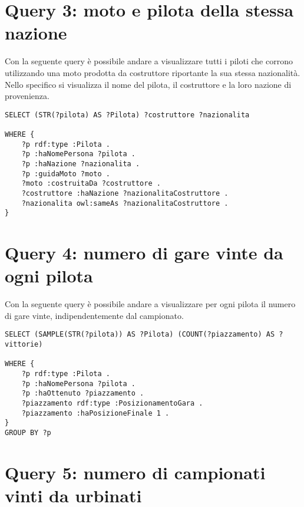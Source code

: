 \newpage

\section{Query 3: moto e pilota della stessa nazione}

Con la seguente query è possibile andare a visualizzare tutti i piloti che corrono utilizzando una moto prodotta da costruttore riportante la sua stessa nazionalità. Nello specifico si visualizza il nome del pilota, il costruttore e la loro nazione di provenienza.
\\

\begin{lstlisting}[captionpos=b, caption=Moto e pilota della stessa nazione, label=lst:sparql3,
   basicstyle=\ttfamily,frame=single]
SELECT (STR(?pilota) AS ?Pilota) ?costruttore ?nazionalita

WHERE {
	?p rdf:type :Pilota .
	?p :haNomePersona ?pilota .
	?p :haNazione ?nazionalita .
	?p :guidaMoto ?moto .
	?moto :costruitaDa ?costruttore .
	?costruttore :haNazione ?nazionalitaCostruttore .
	?nazionalita owl:sameAs ?nazionalitaCostruttore .
}
\end{lstlisting}


\section{Query 4: numero di gare vinte da ogni pilota}

Con la seguente query è possibile andare a visualizzare per ogni pilota il numero di gare vinte, indipendentemente dal campionato.
\\

\begin{lstlisting}[captionpos=b, caption=Numero di gare vinte da ogni pilota, label=lst:sparql4,
   basicstyle=\ttfamily,frame=single]
SELECT (SAMPLE(STR(?pilota)) AS ?Pilota) (COUNT(?piazzamento) AS ?vittorie) 

WHERE {
	?p rdf:type :Pilota .
	?p :haNomePersona ?pilota .
	?p :haOttenuto ?piazzamento .
	?piazzamento rdf:type :PosizionamentoGara .
	?piazzamento :haPosizioneFinale 1 .	
}
GROUP BY ?p
\end{lstlisting}

\newpage

\section{Query 5: numero di campionati vinti da urbinati}

